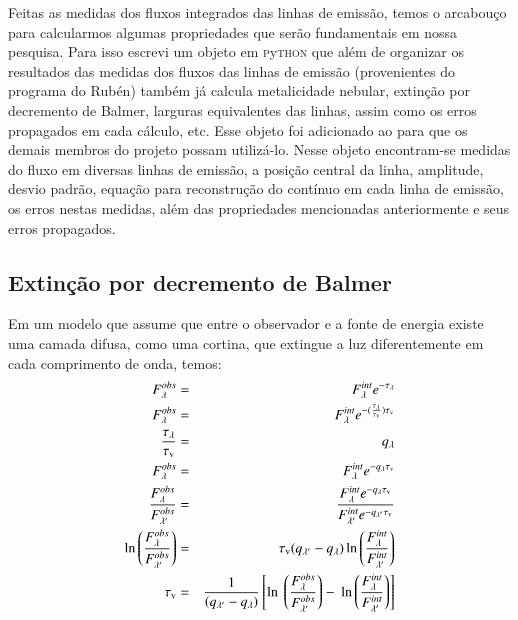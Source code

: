 Feitas as medidas dos fluxos integrados das linhas de emissão, temos o arcabouço para calcularmos
algumas propriedades que serão fundamentais em nossa pesquisa. Para isso escrevi um objeto em
\textsc{p}y\textsc{thon} que além de organizar os resultados das medidas dos fluxos das linhas de
emissão (provenientes do programa do Rubén) também já calcula metalicidade nebular, extinção por
decremento de Balmer, larguras equivalentes das linhas, assim como os erros propagados em cada
cálculo, etc. Esse objeto foi adicionado ao \pycasso \citep{CidFernandes.etal.2013a} para que os
demais membros do projeto possam utilizá-lo. Nesse objeto encontram-se medidas do fluxo em diversas
linhas de emissão, a posição central da linha, amplitude, desvio padrão, equação para reconstrução
do contínuo em cada linha de emissão, os erros nestas medidas, além das propriedades mencionadas
anteriormente e seus erros propagados.

\subsection{Extinção por decremento de Balmer}
\label{sec:emline:datacube:tauvneb}

Em um modelo que assume que entre o observador e a fonte de energia existe uma
camada difusa, como uma cortina, que extingue a luz diferentemente em cada comprimento de
onda, temos:
\begin{eqnarray}
   F_\lambda^{obs} &=& F_\lambda^{int} e^{-\tau_\lambda} \\
   F_\lambda^{obs} &=& F_\lambda^{int} e^{-(\frac{\tau_\lambda}{\tauV}) \tauV} \\
   \frac{\tau_\lambda}{\tauV} &=& q_\lambda \\
   F_\lambda^{obs} &=& F_\lambda^{int} e^{-q_\lambda \tauV} \\
   \frac{F_\lambda^{obs}}{F_{\lambda^\prime}^{obs}} &=& \
 \frac{F_\lambda^{int} e^{-q_\lambda \tauV}}{F_{\lambda^\prime}^{int} e^{-q_{\lambda^\prime} \tauV}} \\
   \ln \left(\frac{F_\lambda^{obs}}{F_{\lambda^\prime}^{obs}}\right) &=& \
 \tauV (q_{\lambda^\prime} - q_\lambda) \ln \left(\frac{F_\lambda^{int}}{F_{\lambda^\prime}^{int}}\right) \\
   \tauV &=& \frac{1}{(q_{\lambda^\prime} - q_\lambda)} \left[\ln \ 
 \left(\frac{F_\lambda^{obs}}{F_{\lambda^\prime}^{obs}}\right) - \
 \ln \left(\frac{F_\lambda^{int}}{F_{\lambda^\prime}^{int}}\right)\right] 
\end{eqnarray}

